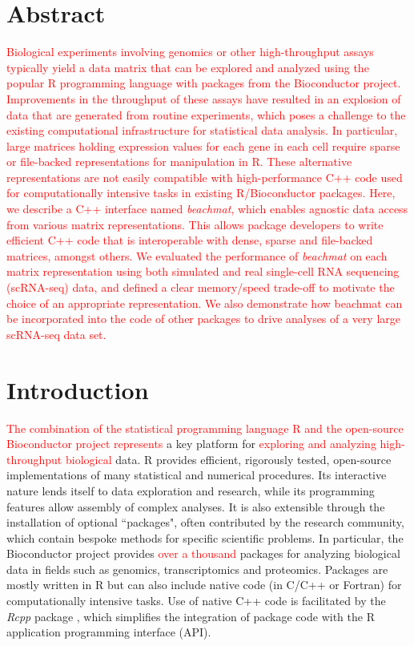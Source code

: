 \documentclass[10pt,letterpaper]{article}
\newcommand{\beachmat}{\textit{beachmat}}
\newcommand{\revised}[1]{\textcolor{red}{#1}}
\begin{document}
\section*{Abstract}
\revised{Biological experiments involving genomics or other high-throughput assays typically yield a data matrix that can be explored and analyzed using the popular R programming language with packages from the Bioconductor project.
Improvements in the throughput of these assays have resulted in an explosion of data that are generated from routine experiments, which poses a challenge to the existing computational infrastructure for statistical data analysis.
In particular, large matrices holding expression values for each gene in each cell require sparse or file-backed representations for manipulation in R.
These alternative representations are not easily compatible with high-performance C++ code used for computationally intensive tasks in existing R/Bioconductor packages.
Here, we describe a C++ interface named \beachmat{}, which enables agnostic data access from various matrix representations.
This allows package developers to write efficient C++ code that is interoperable with dense, sparse and file-backed matrices, amongst others.
We evaluated the performance of \beachmat{} on each matrix representation using both simulated and real single-cell RNA sequencing (scRNA-seq) data, and defined a clear memory/speed trade-off to motivate the choice of an appropriate representation.
We also demonstrate how beachmat can be incorporated into the code of other packages to drive analyses of a very large scRNA-seq data set.}

\linenumbers

\section*{Introduction}
\revised{The combination of the statistical programming language R \cite{R} and the open-source Bioconductor project \cite{gentleman2004bioconductor} represents} a key platform for \revised{exploring and analyzing high-throughput biological} data.
R provides efficient, rigorously tested, open-source implementations of many statistical and numerical procedures.
Its interactive nature lends itself to data exploration and research, while its programming features allow assembly of complex analyses.
It is also extensible through the installation of optional ``packages", often contributed by the research community, which contain bespoke methods for specific scientific problems.
In particular, the Bioconductor project \cite{huber2015orchestrating} provides \revised{over a thousand} packages for analyzing biological data in fields such as genomics, transcriptomics and proteomics.
Packages are mostly written in R but can also include native code (in C/C++ or Fortran) for computationally intensive tasks.
Use of native C++ code is facilitated by the \textit{Rcpp} package \cite{eddelbuettel2011seamless}, which simplifies the integration of package code with the R application programming interface (API).
\end{document}
